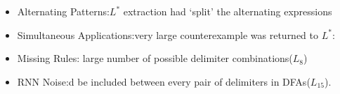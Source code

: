 \documentclass[aspectratio=169%
,serif,mathserif]{beamer}
\begin{document}
\begin{frame}
	\begin{itemize}
		\item Alternating Patterns:$L^*$ extraction had ‘split’ the alternating expressions
		\item Simultaneous Applications:very large counterexample was returned to $L^*$:
		\item Missing Rules: large number of possible delimiter combinations($L_8$)
		\item RNN Noise:d be included between every pair of delimiters in DFAs($L_{15}$).
	\end{itemize}
\end{frame}

\begin{frame}
\hfill
{}
\linespread{3}\selectfont
\end{frame}
\end{document}
